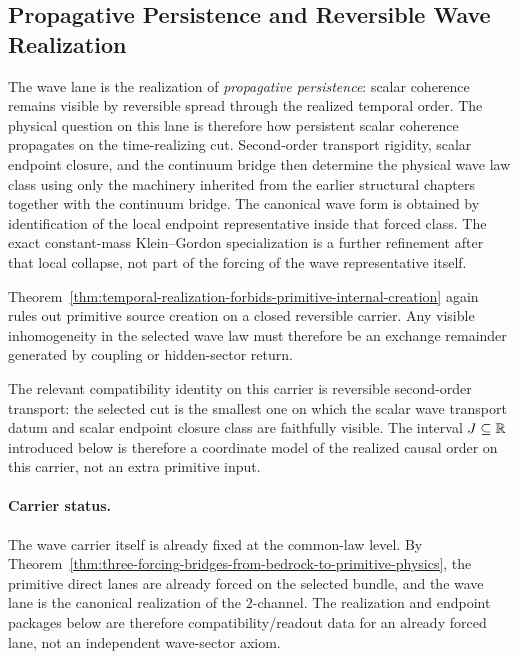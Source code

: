 \subsection{Propagative Persistence and Reversible Wave Realization}
\label{sec:flagship-wave}

The wave lane is the realization of \emph{propagative persistence}: scalar
coherence remains visible by reversible spread through the realized temporal
order. The physical question on this lane is therefore how persistent scalar
coherence propagates on the time-realizing cut. Second-order transport
rigidity, scalar endpoint closure, and the continuum bridge then determine the
physical wave law class using only the machinery inherited from the earlier
structural chapters together with the continuum bridge.
The canonical wave form is obtained by identification of the local endpoint
representative inside that forced class. The exact
constant-mass Klein--Gordon specialization is a further refinement after that
local collapse, not part of the forcing of the wave representative itself.

Theorem~\ref{thm:temporal-realization-forbids-primitive-internal-creation}
again rules out primitive source creation on a closed reversible carrier. Any
visible inhomogeneity in the selected wave law must therefore be an exchange
remainder generated by coupling or hidden-sector return.

The relevant compatibility identity on this carrier is reversible second-order
transport: the selected cut is the smallest one on which the scalar wave
transport datum and scalar endpoint closure class are faithfully visible. The
interval \(J\subseteq\mathbb{R}\) introduced below is therefore a coordinate model of
the realized causal order on this carrier, not an extra primitive input.

\paragraph{Carrier status.}
The wave carrier itself is already fixed at the common-law level. By
Theorem~\ref{thm:three-forcing-bridges-from-bedrock-to-primitive-physics}, the
primitive direct lanes are already forced on the selected bundle, and the wave
lane is the canonical realization of the \(2\)-channel. The realization and
endpoint packages below are therefore compatibility/readout data for an
already forced lane, not an independent wave-sector axiom.

